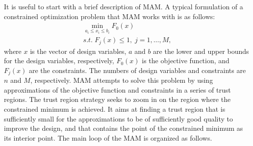 \documentclass[runningheads,a4paper]{llncs}
\begin{document}
It is useful to start with a brief description of MAM. A typical formulation of a constrained optimization problem that MAM works with is as follows:
\begin{equation}
  \label{eq:problem}
  \begin{array}{c}
  \min\limits_{a_i \le x_i \le b_i}F_0(x) \\
  s.t.\; F_j(x) \le 1,\; j=1,\dots ,M,
  \end{array}
\end{equation}
where $x$ is the vector of design variables, $a$ and $b$ are the lower and upper bounds for the design variables, respectively, $F_0(x)$ is the objective function, and $F_j(x)$ are the constraints. The numbers of design variables and constraints are $n$ and $M$, respectively. MAM attempts to solve this problem by using approximations of the objective function and constraints in a series of trust regions. The trust region strategy seeks to zoom in on the region where the constrained minimum is achieved. It aims at finding a trust region that is sufficiently small for the approximations to be of sufficiently good quality to improve the design, and that contains the point of the constrained minimum as its interior point. The main loop of the MAM is organized as follows.
\\
\end{document}
